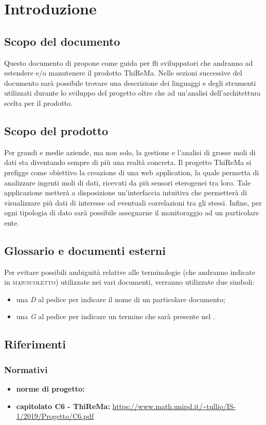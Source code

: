 \section{Introduzione}
	\subsection{Scopo del documento}
		Questo documento di propone come guida per fli sviluppatori che andranno ad estendere e/o manutenere il prodotto ThiReMa. Nelle sezioni successive del documento sarà possibile trovare una descrizione dei linguaggi e degli strumenti utilizzati durante lo sviluppo del progetto oltre che ad un'analisi dell'architettura scelta per il prodotto.
	\subsection{Scopo del prodotto}
	 	Per grandi e medie aziende, ma non solo, la gestione e l'analisi di grosse moli di dati sta diventando sempre di più una realtà concreta.
	 	\newline
		Il progetto ThiReMa si prefigge come obiettivo la creazione di una web application, la quale permetta di analizzare ingenti moli di dati, ricevuti da più sensori eterogenei tra loro. Tale applicazione metterà a disposizione un'interfaccia intuitiva che permetterà di visualizzare più dati di interesse od eventuali correlazioni tra gli stessi. Infine, per ogni tipologia di dato sarà possibile assegnarne il monitoraggio ad un particolare ente.	
	\subsection{Glossario e documenti esterni}
		Per evitare possibili ambiguità relative alle terminologie (che andranno indicate in \textsc{maiuscoletto}) utilizzate nei vari documenti, verranno utilizzate due simboli:
		\begin{itemize}
			\item una \textit{D} al pedice per indicare il nome di un particolare documento;
			\item una \textit{G} al pedice per indicare un termine che sarà presente nel .
		\end{itemize}
		\subsection{Riferimenti}
		\subsubsection{Normativi}
			\begin{itemize}
				\item \textbf{norme di progetto: } 
				\item \textbf{capitolato C6 - ThiReMa: }\url{https://www.math.unipd.it/~tullio/IS-1/2019/Progetto/C6.pdf}
			\end{itemize}
